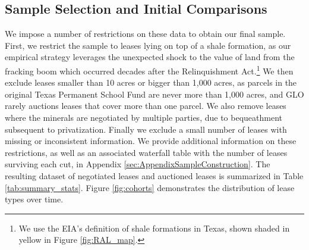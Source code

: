 \documentclass[12pt]{article}
\newcommand{\inputy}[1]{\unskip}
\begin{document}
\subsection{Sample Selection and Initial Comparisons}\label{sec:sampleSelection}
We impose a number of restrictions on these data to obtain our final sample. First, we restrict the sample to leases lying on top of a shale formation, as our empirical strategy leverages the unexpected shock to the value of land from the fracking boom which occurred decades after the Relinquishment Act.\footnote{We use the EIA's definition of shale formations in Texas, shown shaded in yellow in Figure \ref{fig:RAL_map}.} We then exclude leases smaller than 10 acres or bigger than 1,000 acres, as parcels in the original Texas Permanent School Fund are never more than 1,000 acres, and GLO rarely auctions leases that cover more than one parcel. We also remove leases where the minerals are negotiated by multiple parties, due to bequeathment subsequent to privatization. Finally we exclude a small number of leases with missing or inconsistent information. We provide additional information on these restrictions, as well as an associated waterfall table with the number of leases surviving each cut, in Appendix \ref{sec:AppendixSampleConstruction}. The resulting dataset of \inputy{../output/estimates/Nsample_NEGOTIATION_CLEAN.tex} negotiated leases and \inputy{../output/estimates/Nsample_AUCTION_CLEAN.tex} auctioned leases is summarized in Table \ref{tab:summary_stats}. Figure \ref{fig:cohorts} demonstrates the distribution of lease types over time.  
\end{document}

